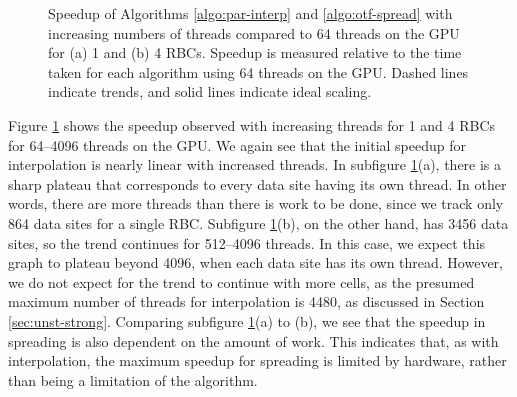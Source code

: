 \begin{figure}[htbp]
\caption{%
    Speedup of Algorithms \ref{algo:par-interp} and \ref{algo:otf-spread} with
    increasing numbers of threads compared to 64 threads on the GPU for (a) 1
    and (b) 4 RBCs. Speedup is measured relative to the time taken for each
    algorithm using 64 threads on the GPU. Dashed lines indicate trends, and
    solid lines indicate ideal scaling.
}
\label{fig:str-strong}
\end{figure}

Figure \ref{fig:str-strong} shows the speedup observed with increasing threads
for 1 and 4 RBCs for 64--4096 threads on the GPU. We again see that the initial
speedup for interpolation is nearly linear with increased threads. In subfigure
\ref{fig:str-strong}(a), there is a sharp plateau that corresponds to every
data site having its own thread. In other words, there are more threads than
there is work to be done, since we track only 864 data sites for a single RBC.
Subfigure \ref{fig:str-strong}(b), on the other hand, has 3456 data sites, so
the trend continues for 512--4096 threads. In this case, we expect this graph
to plateau beyond 4096, when each data site has its own thread. However, we do
not expect for the trend to continue with more cells, as the presumed maximum
number of threads for interpolation is 4480, as discussed in Section
\ref{sec:unst-strong}. Comparing subfigure \ref{fig:str-strong}(a)
to (b), we see that the speedup in spreading is also dependent on the amount of
work. This indicates that, as with interpolation, the maximum speedup for
spreading is limited by hardware, rather than being a limitation of the
algorithm.

